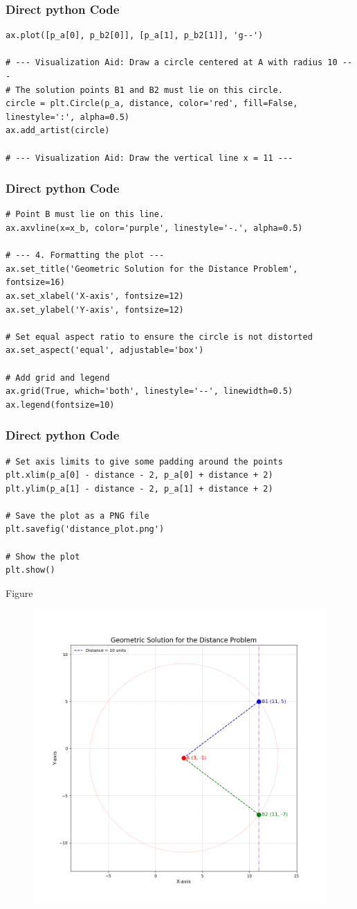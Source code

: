 \documentclass{beamer}
\begin{document}
\begin{frame}[fragile]
\frametitle{Direct python Code}
\begin{lstlisting}
ax.plot([p_a[0], p_b2[0]], [p_a[1], p_b2[1]], 'g--')

# --- Visualization Aid: Draw a circle centered at A with radius 10 ---
# The solution points B1 and B2 must lie on this circle.
circle = plt.Circle(p_a, distance, color='red', fill=False, linestyle=':', alpha=0.5)
ax.add_artist(circle)

# --- Visualization Aid: Draw the vertical line x = 11 ---
\end{lstlisting}
\end{frame}
\begin{frame}[fragile]
\frametitle{Direct python Code}
\begin{lstlisting}
# Point B must lie on this line.
ax.axvline(x=x_b, color='purple', linestyle='-.', alpha=0.5)

# --- 4. Formatting the plot ---
ax.set_title('Geometric Solution for the Distance Problem', fontsize=16)
ax.set_xlabel('X-axis', fontsize=12)
ax.set_ylabel('Y-axis', fontsize=12)

# Set equal aspect ratio to ensure the circle is not distorted
ax.set_aspect('equal', adjustable='box')

# Add grid and legend
ax.grid(True, which='both', linestyle='--', linewidth=0.5)
ax.legend(fontsize=10)
\end{lstlisting}
\end{frame}
\begin{frame}[fragile]
\frametitle{Direct python Code}
\begin{lstlisting}
# Set axis limits to give some padding around the points
plt.xlim(p_a[0] - distance - 2, p_a[0] + distance + 2)
plt.ylim(p_a[1] - distance - 2, p_a[1] + distance + 2)

# Save the plot as a PNG file
plt.savefig('distance_plot.png')

# Show the plot
plt.show()
\end{lstlisting}
\end{frame}
\begin{frame}{Figure}
    \begin{figure}[H]
        \centering
        \includegraphics[width=0.6\columnwidth]{figs/distance_plot.png}
    \end{figure}
\end{frame}
\end{document}
